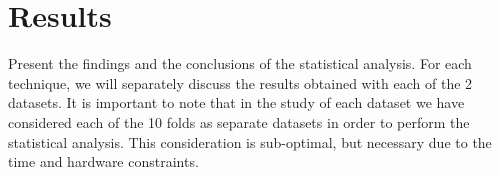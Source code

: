 \section{Results}\label{sec:results}
Present the findings and the conclusions of the statistical analysis. For each technique, we will separately discuss the results obtained with each of the 2 datasets. It is important to note that in the study of each dataset we have considered each of the 10 folds as separate datasets in order to perform the statistical analysis. This consideration is sub-optimal, but necessary due to the time and hardware constraints.








